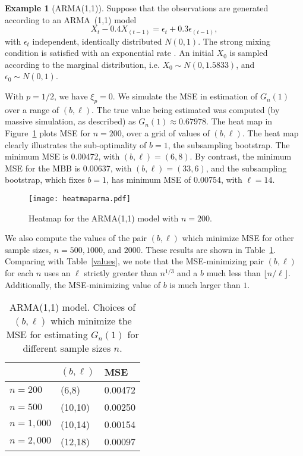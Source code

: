 \documentclass[a4paper, 12pt]{article}
\theoremstyle{plain}
\theoremstyle{definition}
\newtheorem{example}{Example}
\begin{document}
\begin{example}[ARMA(1,1)] Suppose that the observations are generated according to an ARMA~(1,1) model
\[
X_{t}-0.4 X_{(t-1)}=\epsilon_{t}+0.3 \epsilon_{(t-1)},
\]
with $\epsilon_{t}$ independent, identically distributed $N(0,1)$. The strong mixing condition is satisfied with an exponential rate \citep[Example 6.1]{Lahiri:2003}. An initial $X_{0}$ is sampled according to the marginal distribution, i.e. $X_{0} \sim N(0, 1.5833)$, and $\epsilon_{0} \sim N(0,1)$.
\end{example}
With $p=1/2$, we have $\xi_{p} =0$. We simulate the MSE in estimation of $G_n(1)$ over a range of $(b,\ell)$. The true value being estimated was computed (by massive simulation, as described) as $G_{n}(1) \approx 0.67978$. The heat map in Figure~\ref{ARMAheat} plots MSE for $n=200$, over a grid of values of $(b,\ell)$. The heat map clearly illustrates the sub-optimality of $b=1$, the subsampling bootstrap. The minimum MSE is 0.00472, with $(b,\ell)=(6,8)$. By contrast, the minimum MSE for the MBB is 0.00637, with $(b, \ell)=(33,6)$, and the subsampling bootstrap, which fixes $b=1$, has minimum MSE of 0.00754, with $\ell=14$.

\begin{figure}[h]
\centering
\caption{\label{ARMAheat}
Heatmap for the ARMA(1,1) model with $n=200$.}
\texttt{[image: heatmaparma.pdf]}
\end{figure}

We also compute the values of the pair $(b,\ell)$ which minimize MSE for other sample sizes, $n=500, 1000$, and $2000$. These results are shown in Table~\ref{ARMAtable}. Comparing with Table~\ref{values}, we note that the MSE-minimizing pair $(b,\ell)$ for each $n$ uses an $\ell$ strictly greater than $n^{1/3}$ and a $b$ much less than $\lfloor n/\ell \rfloor$. Additionally, the MSE-minimizing value of $b$ is much larger than $1$.

\begin{table}[h]
\caption{\label{ARMAtable}
ARMA(1,1) model. Choices of $(b,\ell)$ which minimize the MSE for estimating $G_{n}(1)$ for different sample sizes $n$.}
\centering
\begin{tabular}{l l l}
& $(b,\ell)$ & MSE \\ \hline
$n=200$  &   (6,8) &  0.00472 \\
$n=500$  &  (10,10) & 0.00250 \\
$n=1,000$ & (10,14) & 0.00154 \\ 
$n=2,000$ & (12,18) & 0.00097 \\
\end{tabular}
\end{table}
\end{document}
